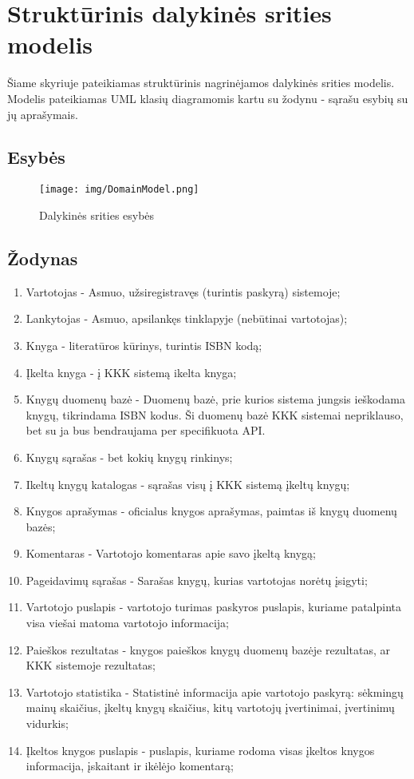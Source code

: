 \documentclass{VUMIFPSkursinis}
\begin{document}
\section{Struktūrinis dalykinės srities modelis}
	Šiame skyriuje pateikiamas struktūrinis nagrinėjamos dalykinės srities modelis. 
	Modelis pateikiamas UML klasių diagramomis kartu su žodynu - sąrašu esybių su jų aprašymais. 
	\subsection{Esybės}
		\begin{figure}[H]
			\centering
			\texttt{[image: img/DomainModel.png]}
			\caption{Dalykinės srities esybės}
			\label{img:psi2-domain-model}
		\end{figure}

	\subsection{Žodynas}
		\begin{enumerate}[label=\textbf{E\arabic*.}]
			\item Vartotojas - Asmuo, užsiregistravęs (turintis paskyrą) sistemoje;
			\item Lankytojas - Asmuo, apsilankęs tinklapyje (nebūtinai vartotojas);
			\item Knyga - literatūros kūrinys, turintis ISBN kodą;
			\item Įkelta knyga - į KKK sistemą ikelta knyga;
			\item Knygų duomenų bazė - Duomenų bazė, prie kurios sistema jungsis ieškodama knygų, tikrindama ISBN kodus. 
				Ši duomenų bazė KKK sistemai nepriklauso, bet su ja bus bendraujama per specifikuota API.
			\item Knygų sąrašas - bet kokių knygų rinkinys;
			\item Ikeltų knygų katalogas - sąrašas visų į KKK sistemą įkeltų knygų;
			\item Knygos aprašymas - oficialus knygos aprašymas, paimtas iš knygų duomenų bazės;
			\item Komentaras - Vartotojo komentaras apie savo įkeltą knygą;
			\item Pageidavimų sąrašas - Sarašas knygų, kurias vartotojas norėtų įsigyti;
			\item Vartotojo puslapis - vartotojo turimas paskyros puslapis, kuriame patalpinta visa viešai matoma vartotojo informacija;
			\item Paieškos rezultatas - knygos paieškos knygų duomenų bazėje rezultatas, ar KKK sistemoje rezultatas;
			\item Vartotojo statistika - Statistinė informacija apie vartotojo paskyrą: sėkmingų mainų skaičius, įkeltų knygų skaičius,
				kitų vartotojų įvertinimai, įvertinimų vidurkis;
			\item Įkeltos knygos puslapis - puslapis, kuriame rodoma visas įkeltos knygos informacija, įskaitant ir ikėlėjo komentarą;
		\end{enumerate}
\end{document}
